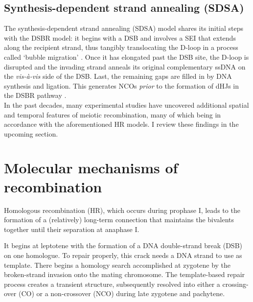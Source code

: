 \subsection{Synthesis-dependent strand annealing (SDSA)}
\label{chap2:model-SDSA}

The synthesis-dependent strand annealing (SDSA) model \citep{resnick1976repair,nassif1994efficient,ferguson1996recombinational} shares its initial steps with the DSBR model: it begins with a DSB and involves a SEI that extends along the recipient strand, thus tangibly translocating the D-loop in a process called ‘bubble migration’ \citep[reviewed in][]{mcmahill2007synthesisdependent}.
Once it has elongated past the DSB site, the D-loop is disrupted and the invading strand anneals its original complementary ssDNA on the \textit{vis-\`a-vis} side of the DSB\@.
Last, the remaining gaps are filled in by DNA synthesis and ligation.
This generates NCOs \textit{prior} to the formation of dHJs in the DSBR pathway \citep{allers2001differential}.\\



In the past decades, many experimental studies have uncovered additional spatial and temporal features of meiotic recombination, many of which being in accordance with the aforementioned HR models. 
I review these findings in the upcoming section.













\section{Molecular mechanisms of recombination}

Homologous recombination (HR), which occurs during prophase I, leads to the formation of a (relatively) long-term connection that maintains the bivalents together until their separation at anaphase I\@.

It begins at leptotene with the formation of a DNA double-strand break (DSB) on one homologue. 
To repair properly, this crack needs a DNA strand to use as template. There begins a homology search accomplished at zygotene by the broken-strand invasion onto the mating chromosome.
The template-based repair process creates a transient structure, subsequently resolved into either a crossing-over (CO) or a non-crossover (NCO) during late zygotene and pachytene.


